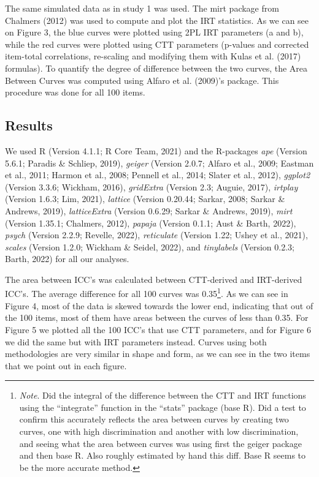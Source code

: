 \documentclass[
  man]{apa6}
\begin{document}
The same simulated data as in study 1 was used. The mirt package from Chalmers (2012) was used to compute and plot the IRT statistics. As we can see on Figure 3, the blue curves were plotted using 2PL IRT parameters (a and b), while the red curves were plotted using CTT parameters (p-values and corrected item-total correlations, re-scaling and modifying them with Kulas et al. (2017) formulas). To quantify the degree of difference between the two curves, the Area Between Curves was computed using Alfaro et al. (2009)'s package. This procedure was done for all 100 items.

\hypertarget{results-1}{%
\subsection{Results}\label{results-1}}

We used R (Version 4.1.1; R Core Team, 2021) and the R-packages \emph{ape} (Version 5.6.1; Paradis \& Schliep, 2019), \emph{geiger} (Version 2.0.7; Alfaro et al., 2009; Eastman et al., 2011; Harmon et al., 2008; Pennell et al., 2014; Slater et al., 2012), \emph{ggplot2} (Version 3.3.6; Wickham, 2016), \emph{gridExtra} (Version 2.3; Auguie, 2017), \emph{irtplay} (Version 1.6.3; Lim, 2021), \emph{lattice} (Version 0.20.44; Sarkar, 2008; Sarkar \& Andrews, 2019), \emph{latticeExtra} (Version 0.6.29; Sarkar \& Andrews, 2019), \emph{mirt} (Version 1.35.1; Chalmers, 2012), \emph{papaja} (Version 0.1.1; Aust \& Barth, 2022), \emph{psych} (Version 2.2.9; Revelle, 2022), \emph{reticulate} (Version 1.22; Ushey et al., 2021), \emph{scales} (Version 1.2.0; Wickham \& Seidel, 2022), and \emph{tinylabels} (Version 0.2.3; Barth, 2022) for all our analyses.

The area between ICC's was calculated between CTT-derived and IRT-derived ICC's. The average difference for all 100 curves was 0.35\footnote{\emph{Note}. Did the integral of the difference between the CTT and IRT functions using the ``integrate'' function in the ``stats'' package (base R). Did a test to confirm this accurately reflects the area between curves by creating two curves, one with high discrimination and another with low discrimination, and seeing what the area between curves was using first the geiger package and then base R. Also roughly estimated by hand this diff. Base R seems to be the more accurate method.}. As we can see in Figure 4, most of the data is skewed towards the lower end, indicating that out of the 100 items, most of them have areas between the curves of less than 0.35.
For Figure 5 we plotted all the 100 ICC's that use CTT parameters, and for Figure 6 we did the same but with IRT parameters instead. Curves using both methodologies are very similar in shape and form, as we can see in the two items that we point out in each figure.
\end{document}
